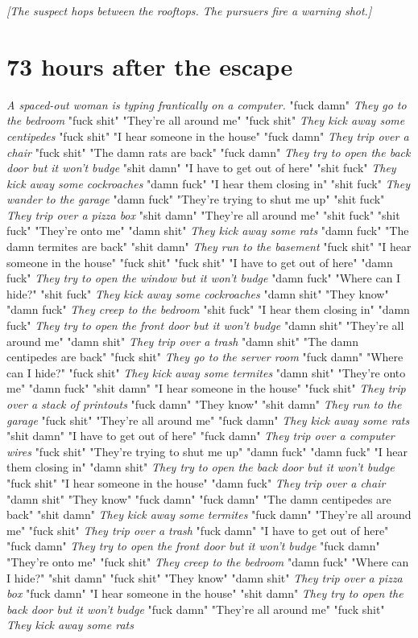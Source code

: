 \documentclass{report}
\begin{document}
\textit{[The suspect hops between the rooftops. The pursuers fire a warning shot.]}


\section*{73 \small{hours after the escape}}

\textit{A spaced-out woman is typing frantically on a computer.} "fuck damn" \textit{They go to the bedroom} "fuck shit" "They're all around me" "fuck shit" \textit{They kick away some centipedes} "fuck shit" "I hear someone in the house" "fuck damn" \textit{They trip over a chair} "fuck shit" "The damn rats are back" "fuck damn" \textit{They try to open the back door but it won't budge} "shit damn" "I have to get out of here" "shit fuck" \textit{They kick away some cockroaches} "damn fuck" "I hear them closing in" "shit fuck" \textit{They wander to the garage} "damn fuck" "They're trying to shut me up" "shit fuck" \textit{They trip over a pizza box} "shit damn" "They're all around me" "shit fuck" \textit{} "shit fuck" "They're onto me" "damn shit" \textit{They kick away some rats} "damn fuck" "The damn termites are back" "shit damn" \textit{They run to the basement} "fuck shit" "I hear someone in the house" "fuck shit" \textit{} "fuck shit" "I have to get out of here" "damn fuck" \textit{They try to open the window but it won't budge} "damn fuck" "Where can I hide?" "shit fuck" \textit{They kick away some cockroaches} "damn shit" "They know" "damn fuck" \textit{They creep to the bedroom} "shit fuck" "I hear them closing in" "damn fuck" \textit{They try to open the front door but it won't budge} "damn shit" "They're all around me" "damn shit" \textit{They trip over a trash} "damn shit" "The damn centipedes are back" "fuck shit" \textit{They go to the server room} "fuck damn" "Where can I hide?" "fuck shit" \textit{They kick away some termites} "damn shit" "They're onto me" "damn fuck" \textit{} "shit damn" "I hear someone in the house" "fuck shit" \textit{They trip over a stack of printouts} "fuck damn" "They know" "shit damn" \textit{They run to the garage} "fuck shit" "They're all around me" "fuck damn" \textit{They kick away some rats} "shit damn" "I have to get out of here" "fuck damn" \textit{They trip over a computer wires} "fuck shit" "They're trying to shut me up" "damn fuck" \textit{} "damn fuck" "I hear them closing in" "damn shit" \textit{They try to open the back door but it won't budge} "fuck shit" "I hear someone in the house" "damn fuck" \textit{They trip over a chair} "damn shit" "They know" "fuck damn" \textit{} "fuck damn" "The damn centipedes are back" "shit damn" \textit{They kick away some termites} "fuck damn" "They're all around me" "fuck shit" \textit{They trip over a trash} "fuck damn" "I have to get out of here" "fuck damn" \textit{They try to open the front door but it won't budge} "fuck damn" "They're onto me" "fuck shit" \textit{They creep to the bedroom} "damn fuck" "Where can I hide?" "shit damn" \textit{} "fuck shit" "They know" "damn shit" \textit{They trip over a pizza box} "fuck damn" "I hear someone in the house" "shit damn" \textit{They try to open the back door but it won't budge} "fuck damn" "They're all around me" "fuck shit" \textit{They kick away some rats} 
\end{document}
